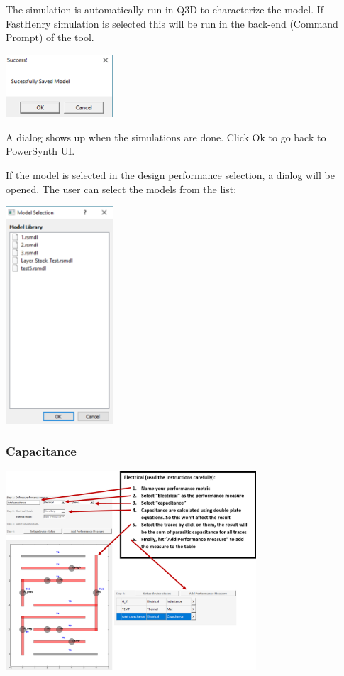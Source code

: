 \documentclass[11pt]{article}
\begin{document}
The simulation is automatically run in Q3D to characterize the model. If FastHenry simulation is selected this will be run in the back-end (Command Prompt) of the tool.

\begin{center}
\includegraphics[width=4cm]{./figs/23_RS2.png}
\end{center}

A dialog shows up when the simulations are done. Click Ok to go back to PowerSynth UI.

If the model is selected in the design performance selection, a dialog will be opened. The user can select the models from the list:

\begin{center}
\includegraphics[width=4cm]{./figs/24_RS3.png}
\end{center}

\pagebreak

\subsubsection{Capacitance}
\label{sec-2-5-6}

\begin{center}
\includegraphics[width=0.7\textwidth]{./figs/25_Capacitance.png}
\end{center}
\end{document}
